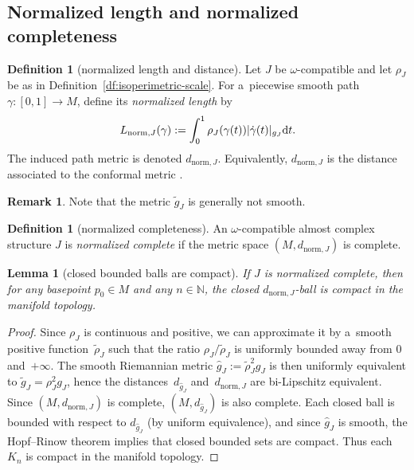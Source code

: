 \documentclass[pdftex]{sigma}
\numberwithin{equation}{section}
\newcommand{\bN}{{\mathbb N}}
\newtheorem{lm}[Theorem]{Lemma}
\theoremstyle{definition}
\newtheorem{df}[Theorem]{Definition}
\newtheorem{rem}[Theorem]{Remark}
\begin{document}
\subsection{Normalized length and normalized completeness}\label{subsec:normalized-distance}
\begin{df}[normalized length and distance]\label{df:normalized-distance}
Let $J$ be $\omega$-compatible and let $\rho_J$ be as in Definition~\ref{df:isoperimetric-scale}.
For a~piecewise smooth path $\gamma\colon [0,1]\to M$, define its \emph{normalized length} by
\[
L_{\mathrm{norm},J}(\gamma):=\int_{0}^{1}\rho_J(\gamma(t)) |\dot\gamma(t)|_{g_J}{\rm d}t.
\]
The induced path metric is denoted $d_{\mathrm{norm},J}$.
Equivalently, $d_{\mathrm{norm},J}$ is the distance associated to the conformal metric .
\end{df}
\begin{rem}
Note that the metric $\widetilde g_J$ is generally not smooth.
\end{rem}
\begin{df}[normalized completeness]\label{df:normalized-complete}
An $\omega$-compatible almost complex structure $J$ is \emph{normalized complete} if the metric space $(M,d_{\mathrm{norm},J})$ is complete.
\end{df}

\begin{lm}[closed bounded balls are compact]\label{lem:bounded-balls-compact}
 If $J$ is normalized complete, then for any basepoint $p_0\in M$ and any $n\in\bN$, the closed $d_{\mathrm{norm},J}$-ball  is compact in the manifold topology.
 \end{lm}
 \begin{proof}
 Since $\rho_J$ is continuous and positive, we can approximate it by a~smooth positive function~$\widetilde\rho_J$ such that the ratio $\rho_J/\widetilde\rho_J$ is uniformly bounded away from $0$ and~$+\infty$.
 The smooth Riemannian metric $\widehat g_J:=\widetilde\rho_J^{2}g_J$ is then uniformly equivalent to $\widetilde g_J=\rho_J^{2}g_J$, hence the distances~$d_{\widehat g_J}$ and~$d_{\mathrm{norm},J}$ are bi-Lipschitz equivalent.
 Since $(M,d_{\mathrm{norm},J})$ is complete, $(M,d_{\widehat g_J})$ is also complete.
 Each closed ball  is bounded with respect to $d_{\widehat g_J}$ (by uniform equivalence), and since $\widehat g_J$ is smooth, the Hopf--Rinow theorem implies that closed bounded sets are compact.
 Thus each $K_n$ is compact in the manifold topology.
 \end{proof}
\end{document}
